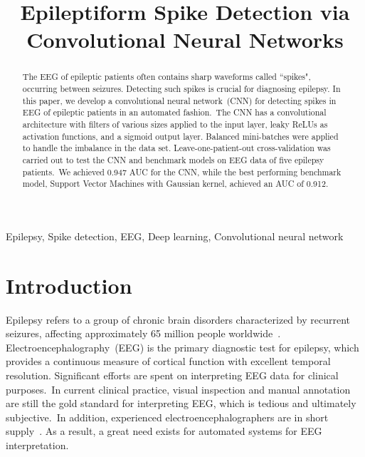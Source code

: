 \documentclass{article}
\title{Epileptiform Spike Detection via Convolutional Neural Networks}
\begin{document}
%
\maketitle
%
\begin{abstract}
The EEG of epileptic patients often contains sharp waveforms called ``spikes", occurring between seizures.
Detecting such spikes is crucial for diagnosing epilepsy.
In this paper, we develop a convolutional neural network~(CNN) for detecting spikes in EEG of epileptic patients in an automated fashion.~The CNN has a convolutional architecture with filters of various sizes applied to the input layer, leaky ReLUs as activation functions, and a sigmoid output layer.
Balanced mini-batches were applied to handle the imbalance in the data set.
Leave-one-patient-out cross-validation was carried out to test the CNN and benchmark models on EEG data of five epilepsy patients.~We achieved 0.947 AUC for the CNN, while the best performing benchmark model, Support Vector Machines with Gaussian kernel, achieved
an AUC of 0.912.

\end{abstract}
%
\begin{keywords}
Epilepsy, Spike detection, EEG, Deep learning, Convolutional neural network
\end{keywords}
%
\section{Introduction}
\label{sec:intro}
Epilepsy refers to a group of chronic brain disorders characterized by recurrent seizures, affecting approximately 65 million people worldwide~\cite{EFA2014epilepsy}.
Electroencephalography~(EEG) is the primary diagnostic test for epilepsy, which provides a continuous measure of cortical function with excellent temporal resolution.
Significant efforts are spent on interpreting EEG data for clinical purposes.~In current clinical practice, visual inspection and manual annotation are still the gold standard for interpreting EEG, which is tedious and ultimately subjective.~In addition, experienced electroencephalographers are in short supply~\cite{racette2014supply}.
As a result, a great need exists for automated systems for EEG interpretation.\\
\end{document}
